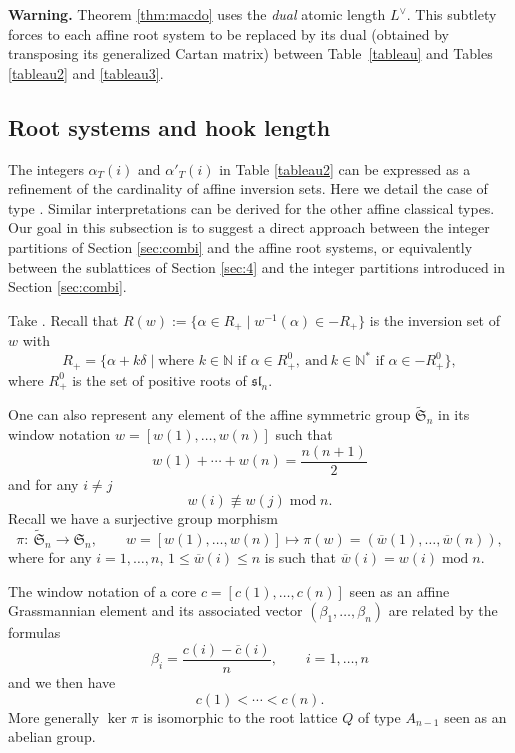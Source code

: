 \documentclass[10pt,a4paper]{amsart}
\numberwithin{equation}{section}
\newcommand{\N}{\mathbb{N}}
\newcommand{\func}[1]{\operatorname{#1}}
\begin{document}
 \textbf{Warning.} Theorem \ref{thm:macdo} uses the \textit{dual} atomic length $L^{\vee}$. This subtlety forces to each affine root system to be replaced by its dual (obtained by transposing its generalized Cartan matrix) between Table~\ref{tableau} and Tables \ref{tableau2} and \ref{tableau3}.

\subsection{Root systems and hook length}

The integers $\alpha_T(i)$ and $\alpha'_T(i)$ in Table \ref{tableau2} can be expressed as a refinement of the cardinality of affine inversion sets. Here we detail the case of type . Similar interpretations can be derived for the other affine classical types. Our goal in this subsection is to suggest a direct approach between the integer partitions of Section \ref{sec:combi} and the affine root systems, or equivalently between the sublattices of Section \ref{sec:4} and the integer partitions introduced in Section \ref{sec:combi}.

Take . Recall that $R(w):=\big\lbrace\alpha\in R_+\mid w^{-1}(\alpha)\in-R_+\bigr\rbrace$ is the inversion set of $w$ with{\samepage
\[R_+=\bigl\lbrace \alpha+k\delta\mid \text{where } k\in \N \text{ if } \alpha\in R_+^{0},  \ \text{and} \
k\in \N^* \text{ if } \alpha\in -R_+^{0}\bigr\rbrace,\]
where $R_+^{0}$ is the set of positive roots of $\mathfrak{sl}_n$.}

One can also represent any element of the affine symmetric group $\widetilde{\mathfrak{S}}_{n}$ in its window notation $w=[w(1),\dots ,w(n)]$ such that%
\begin{equation*}
w(1)+\cdots +w(n)=\frac{n(n+1)}{2}
\end{equation*}%
and for any $i\neq j$%
\begin{equation*}
w(i)\not\equiv w(j)\func{mod}n.
\end{equation*}%
Recall we have a surjective group morphism%
\begin{equation*}
\pi \colon \
\widetilde{\mathfrak{S}}_{n}\rightarrow \mathfrak{S}_{n} ,\qquad
w=[w(1),\dots ,w(n)]\mapsto \pi (w)=(\overline{w}(1),\dots ,\overline{w}%
(n)),
\end{equation*}
where for any $i=1,\dots ,n$, $1\leq \overline{w}(i)\leq n$ is such that $%
\overline{w}(i)=w(i)\func{mod}n$.


The window notation of a core $c=[c(1),\dots ,c(n)]$ seen as an affine
Grassmannian element and its associated vector $(\beta _{1},\dots ,\beta
_{n})$ are related by the formulas%
\begin{equation*}
\beta _{i}=\frac{c(i)-\overline{c}(i)}{n},\qquad i=1,\dots ,n
\end{equation*}%
and we then have
\begin{equation*}
c(1)<\cdots <c(n).
\end{equation*}%
More generally $\ker \pi $ is isomorphic to the root lattice $Q$ of type $%
A_{n-1}$ seen as an abelian group.
\end{document}
